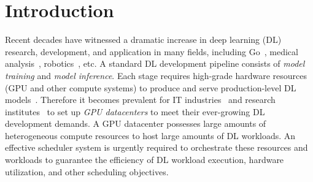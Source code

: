 


































\section{Introduction}
\label{sec_intro}



Recent decades have witnessed a dramatic increase in deep learning (DL) research, development, and application in many fields, including Go~\cite{silver2017mastering}, medical analysis~\cite{shen2017deep}, robotics~\cite{gu2017deep}, etc. A standard DL development pipeline consists of \textit{model training} and \textit{model inference}. Each stage requires high-grade hardware resources (GPU and other compute systems) to produce and serve production-level DL models~\cite{Philly,MLaaS,Gavel,Helios}. Therefore it becomes prevalent for IT industries~\cite{Helios,MLaaS} and research institutes~\cite{Philly,RIFLING,DLQoSSched} to set up \textit{GPU datacenters} to meet their ever-growing DL development demands. A GPU datacenter possesses large amounts of heterogeneous compute resources to host large amounts of DL workloads.  An effective scheduler system is urgently required to orchestrate these resources and workloads to guarantee the efficiency of DL workload execution, hardware utilization, and other scheduling objectives.


